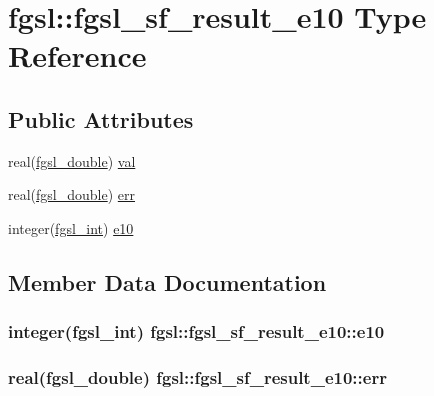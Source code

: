 \hypertarget{structfgsl_1_1fgsl__sf__result__e10}{}\section{fgsl\+:\+:fgsl\+\_\+sf\+\_\+result\+\_\+e10 Type Reference}
\label{structfgsl_1_1fgsl__sf__result__e10}
\subsection*{Public Attributes}
\begin{DoxyCompactItemize}
\item 
real(\hyperlink{namespacefgsl_a9af5113378e0f000eb479d3f90196ddf}{fgsl\+\_\+double}) \hyperlink{structfgsl_1_1fgsl__sf__result__e10_a5b7c6b37adb7724bdf69637b74f65395}{val}
\item 
real(\hyperlink{namespacefgsl_a9af5113378e0f000eb479d3f90196ddf}{fgsl\+\_\+double}) \hyperlink{structfgsl_1_1fgsl__sf__result__e10_a3ae421b4307c79b813f7d70187290fd8}{err}
\item 
integer(\hyperlink{namespacefgsl_a222deda1d7a0c0e845ce4a683318efeb}{fgsl\+\_\+int}) \hyperlink{structfgsl_1_1fgsl__sf__result__e10_a9fd222d7b55ec57cb27b8659b09c13b0}{e10}
\end{DoxyCompactItemize}


\subsection{Member Data Documentation}
\hypertarget{structfgsl_1_1fgsl__sf__result__e10_a9fd222d7b55ec57cb27b8659b09c13b0}{}
\subsubsection[{e10}]{\setlength{\rightskip}{0pt plus 5cm}integer({\bf fgsl\+\_\+int}) fgsl\+::fgsl\+\_\+sf\+\_\+result\+\_\+e10\+::e10}\label{structfgsl_1_1fgsl__sf__result__e10_a9fd222d7b55ec57cb27b8659b09c13b0}
\hypertarget{structfgsl_1_1fgsl__sf__result__e10_a3ae421b4307c79b813f7d70187290fd8}{}
\subsubsection[{err}]{\setlength{\rightskip}{0pt plus 5cm}real({\bf fgsl\+\_\+double}) fgsl\+::fgsl\+\_\+sf\+\_\+result\+\_\+e10\+::err}\label{structfgsl_1_1fgsl__sf__result__e10_a3ae421b4307c79b813f7d70187290fd8}
\hypertarget{structfgsl_1_1fgsl__sf__result__e10_a5b7c6b37adb7724bdf69637b74f65395}{}
